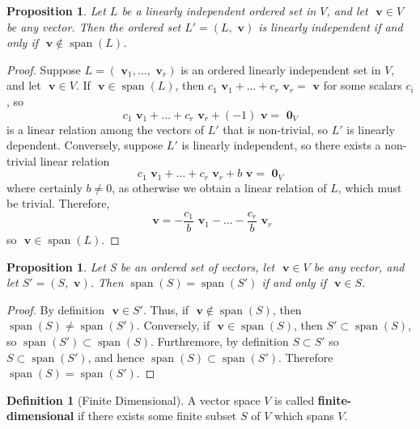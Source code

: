 \documentclass[12pt]{article}
\newtheorem{prop}[thm]{Proposition}
\theoremstyle{definition}
\newtheorem{defn}[thm]{Definition}
\theoremstyle{remark}
\numberwithin{equation}{section}
\newcommand\B[1]{\textbf{ #1}}
\DeclareMathOperator{\spn}{span}
\begin{document}
\begin{prop}
        Let $L$ be a linearly independent ordered set in $V$, and let $\B{v} \in V$ be any vector. Then the ordered set $L' = (L,\B{v})$ is linearly independent if and only if $\B{v} \notin \spn(L)$.
\end{prop}
\begin{proof}
        Suppose $L = (\B{v}_1,...,\B{v}_r)$ is an ordered linearly independent set in $V$, and let $\B{v} \in V$. If $\B{v} \in \spn(L)$, then $c_1\B{v}_1+...+c_r\B{v}_r = \B{v}$ for some scalars $c_i$, so \begin{equation*}
                c_1\B{v}_1+...+c_r\B{v}_r + (-1)\B{v} = \B{0}_V
        \end{equation*}
        is a linear relation among the vectors of $L'$ that is non-trivial, so $L'$ is linearly dependent. Conversely, suppose $L'$ is linearly independent, so there exists a non-trivial linear relation \begin{equation*}
                c_1\B{v}_1+...+c_r\B{v}_r + b\B{v} = \B{0}_V
        \end{equation*}
        where certainly $b \neq 0$, as otherwise we obtain a linear relation of $L$, which must be trivial. Therefore, \begin{equation*}
                \B{v} = -\frac{c_1}{b}\B{v}_1-...-\frac{c_r}{b}\B{v}_r
        \end{equation*}
        so $\B{v} \in \spn(L)$.
\end{proof}

\vspace{15pt}

\begin{prop}
        Let S be an ordered set of vectors, let $\B{v} \in V$ be any vector, and let $S' = (S,\B{v})$. Then $\spn(S) = \spn(S')$ if and only if $\B{v} \in S$.
\end{prop}

\begin{proof}
        By definition $\B{v} \in S'$. Thus, if $\B{v} \notin \spn(S)$, then $\spn(S) \neq \spn(S')$. Conversely, if $\B{v} \in \spn(S)$, then $S' \subset \spn(S)$, so $\spn(S') \subset \spn(S)$. Furthremore, by definition $S \subset S'$ so $S \subset \spn(S')$, and hence $\spn(S) \subset \spn(S')$. Therefore $\spn(S) = \spn(S')$.
\end{proof}

\vspace{15pt}

\begin{defn}[Finite Dimensional]
        A vector space $V$ is called \B{finite-dimensional} if there exists some finite subset $S$ of $V$ which spans $V$.
\end{defn}
\end{document}
